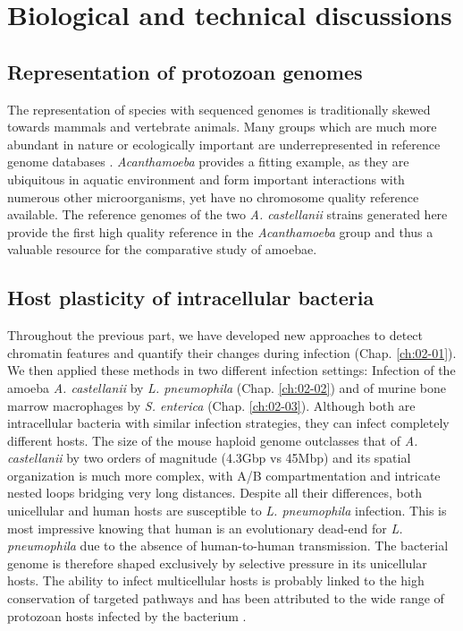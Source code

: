
\chapter{Biological and technical discussions} %
\label{ch:03-01} %

\section{Representation of protozoan genomes}

The representation of species with sequenced genomes is traditionally skewed towards mammals and vertebrate animals. Many groups which are much more abundant in nature or ecologically important are underrepresented in reference genome databases \cite{davidSequencingDisparityGenomic2019}. \textit{Acanthamoeba} provides a fitting example, as they are ubiquitous in aquatic environment and form important interactions with numerous other microorganisms, yet have no chromosome quality reference available. The reference genomes of the two \textit{A. castellanii} strains generated here provide the first high quality reference in the \textit{Acanthamoeba} group and thus a valuable resource for the comparative study of amoebae.

\section{Host plasticity of intracellular bacteria}

Throughout the previous part, we have developed new approaches to detect chromatin features and quantify their changes during infection (Chap. \ref{ch:02-01}). We then applied these methods in two different infection settings: Infection of the amoeba \textit{A. castellanii} by \textit{L. pneumophila} (Chap. \ref{ch:02-02}) and of murine bone marrow macrophages by \textit{S. enterica} (Chap. \ref{ch:02-03}). Although both are intracellular bacteria with similar infection strategies, they can infect completely different hosts. The size of the mouse haploid genome outclasses that of \textit{A. castellanii} by two orders of magnitude (4.3Gbp vs 45Mbp) and its spatial organization is much more complex, with A/B compartmentation and intricate nested loops bridging very long distances. Despite all their differences, both unicellular and human hosts are susceptible to \textit{L. pneumophila} infection. This is most impressive knowing that human is an evolutionary dead-end for \textit{L. pneumophila} due to the absence of human-to-human transmission. The bacterial genome is therefore shaped exclusively by selective pressure in its unicellular hosts. The ability to infect multicellular hosts is probably linked to the high conservation of targeted pathways and has been attributed to the wide range of protozoan hosts infected by the bacterium \cite{molofskyDifferentiateThriveLessons2004}.

